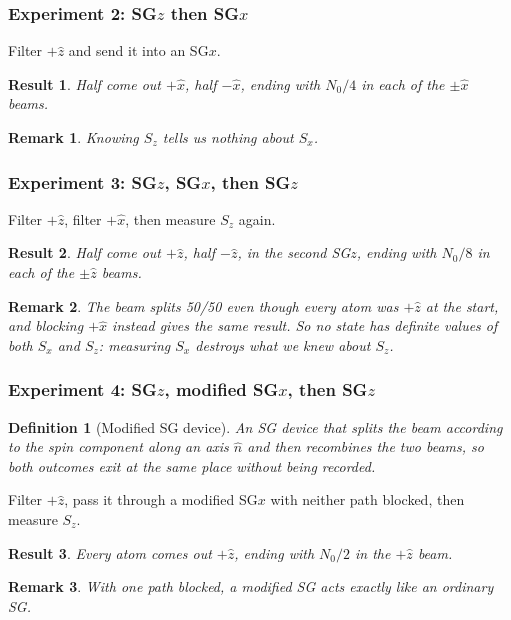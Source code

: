 \documentclass{article}
\newtheorem{definition}{Definition}
\newtheorem{remark}{Remark}
\newtheorem{result}{Result}
\begin{document}
\subsubsection{\texorpdfstring{Experiment 2: SG$z$ then SG$x$}{Experiment 2: SGz then SGx}}
Filter $+\hat{z}$ and send it into an SG$x$.
\begin{result}
    Half come out $+\hat{x}$, half $-\hat{x}$, ending with $N_0/4$ in each of the $\pm\hat{x}$ beams.
\end{result}
\begin{remark}
    Knowing $S_z$ tells us nothing about $S_x$.
\end{remark}

\subsubsection{\texorpdfstring{Experiment 3: SG$z$, SG$x$, then SG$z$}{Experiment 3: SGz, SGx, then SGz}}
Filter $+\hat{z}$, filter $+\hat{x}$, then measure $S_z$ again.
\begin{result}
    Half come out $+\hat{z}$, half $-\hat{z}$, in the second SG$z$, ending with $N_0/8$ in each of the $\pm\hat{z}$ beams.
\end{result}
\begin{remark}
    The beam splits 50/50 even though every atom was $+\hat{z}$ at the start, and blocking $+\hat{x}$ instead gives the same result. So no state has definite values of both $S_x$ and $S_z$: measuring $S_x$ destroys what we knew about $S_z$.
\end{remark}

\subsubsection{\texorpdfstring{Experiment 4: SG$z$, modified SG$x$, then SG$z$}{Experiment 4: SGz, modified SGx, then SGz}}
\begin{definition}[Modified SG device]
    An SG device that splits the beam according to the spin component along an axis $\hat{n}$ and then recombines the two beams, so both outcomes exit at the same place without being recorded.
\end{definition}
Filter $+\hat{z}$, pass it through a modified SG$x$ with neither path blocked, then measure $S_z$.
\begin{result}
    Every atom comes out $+\hat{z}$, ending with $N_0/2$ in the $+\hat{z}$ beam.
\end{result}
\begin{remark}
    With one path blocked, a modified SG acts exactly like an ordinary SG.
\end{remark}
\end{document}
